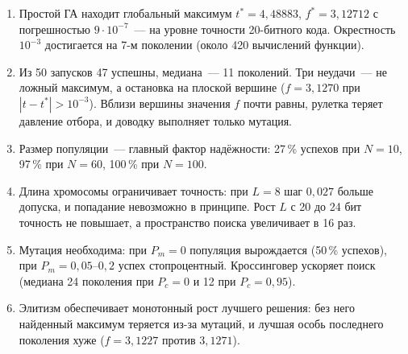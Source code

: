 \documentclass[14pt,a4paper]{extarticle}
\begin{document}
\begin{enumerate}
\item Простой ГА находит глобальный максимум $t^* = 4{,}48883$, $f^* = 3{,}12712$ с погрешностью $9 \cdot 10^{-7}$~--- на уровне точности 20-битного кода. Окрестность $10^{-3}$ достигается на 7-м поколении (около 420 вычислений функции).
\item Из 50 запусков 47 успешны, медиана~--- 11 поколений. Три неудачи~--- не ложный максимум, а остановка на плоской вершине ($f = 3{,}1270$ при $|t - t^*| > 10^{-3}$). Вблизи вершины значения $f$ почти равны, рулетка теряет давление отбора, и доводку выполняет только мутация.
\item Размер популяции~--- главный фактор надёжности: 27\,\% успехов при $N = 10$, 97\,\% при $N = 60$, 100\,\% при $N = 100$.
\item Длина хромосомы ограничивает точность: при $L = 8$ шаг $0{,}027$ больше допуска, и попадание невозможно в принципе. Рост $L$ с 20 до 24 бит точность не повышает, а пространство поиска увеличивает в 16 раз.
\item Мутация необходима: при $P_m = 0$ популяция вырождается (50\,\% успехов), при $P_m = 0{,}05$--$0{,}2$ успех стопроцентный. Кроссинговер ускоряет поиск (медиана 24 поколения при $P_c = 0$ и 12 при $P_c = 0{,}95$).
\item Элитизм обеспечивает монотонный рост лучшего решения: без него найденный максимум теряется из-за мутаций, и лучшая особь последнего поколения хуже ($f = 3{,}1227$ против $3{,}1271$).
\end{enumerate}
\end{document}
